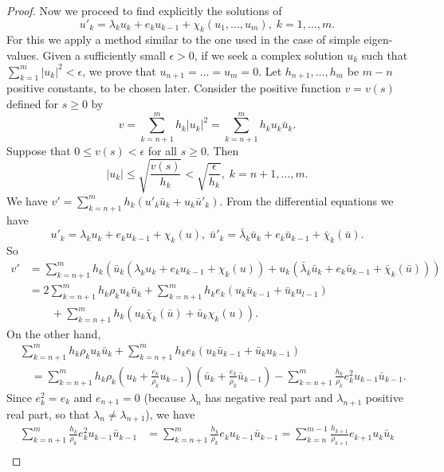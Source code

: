 \begin{proof}
Now we proceed to find explicitly the solutions of 
$$
u'_k  = \lambda_k u_k + e_k u_{k-1} + \chi_k (u_1, \ldots, u_m), \; k =1, \ldots, m.
$$
For this we apply a method similar to the one used in the case of
simple eigen-values. Given a sufficiently small $\epsilon > 0$, if we
seek a complex solution $u_k$ such that  $\sum\limits^m_{k=1} |u_k|^2
< \epsilon$, we prove that $u_{n+1} = \ldots = u_m = 0$.\pageoriginale
Let $h_{n+1}, \ldots, h_m$ be $m-n$ positive constants, to be chosen
later. Consider the positive function $v = v(s)$ defined for $s \geq
0$ by 
$$
v = \sum\limits^m_{k=n+1} h_k |u_k|^2 = \sum\limits^m_{k=n+1} h_k u_k
\bar{u}_k. 
$$
Suppose that $0 \leq v(s) < \epsilon$  for all $s \geq 0$. Then 
$$
|u_k| \leq \sqrt{\frac{v(s)}{h_k}} < \sqrt{\frac{\epsilon}{h_k}}, \; k
= n+1, \ldots, m. 
$$
We have $v' = \sum\limits^m_{k=n+1} h_k (u'_k \bar{u}_k+
u_k\bar{u}'_k) $. From the differential equations we have 
$$
u'_k= \lambda_k u_k + e_k u_{k-1} + \chi_k(u), \; \bar{u}'_k =
\bar{\lambda}_k \bar{u}_k + e_k \bar{u}_{k-1} + \bar{\chi}_k
(\bar{u}).  
$$
So
\begin{align*}
v' & = \sum\limits^m_{k=n+1} h_k (\bar{u}_k (\lambda_k u_k + e_k
u_{k-1} + \chi_k(u)) + u_k (\bar{\lambda}_k \bar{u}_k + e_k
\bar{u}_{k-1} + \bar{\chi}_k (\bar{u})))\\ 
& = 2 \sum\limits^m_{k=n+1} h_k \rho_k u_k \bar{u}_k +
\sum\limits^m_{k=n+1} h_k e_k (u_k \bar{u}_{k-1} + \bar{u}_k u_{l-1})\\
&\qquad + \sum\limits^m_{k=n+1} h_k (u_k \bar{\chi}_k (\bar{u}) + \bar{u}_k
\chi_k (u)). 
\end{align*}
On the other hand, 
\begin{align*}
& \sum\limits^m_{k=n+1} h_k \rho_k u_k \bar{u}_k +
  \sum\limits^m_{k=n+1} h_k e_k (u_k\bar{u}_{k-1} + \bar{u}_k
  u_{k-1})\\ 
& \quad  = \sum\limits^m_{k=n+1} h_k \rho_k(u_k + \frac{e_k}{\rho_k}
  u_{k-1}) (\bar{u}_k + \frac{e_k}{\rho_k} \bar{u}_{k-1}) -
  \sum\limits^m_{k=n+1} \frac{h_k}{\rho_k} e^{2}_k u_{k-1}
  \bar{u}_{k-1}. 
\end{align*}
Since $e^2_k = e_k$ and $e_{n+1} = 0$ (because $\lambda_n$ has
negative real part and $\lambda_{n+1}$ positive real part, so that
$\lambda_n \neq \lambda_{n+1}$), we have  
\begin{align*}
\sum\limits^m_{k=n+1} \frac{h_k}{\rho_k} e^2_k u_{k-1} \bar{u}_{k-1} &
= \sum\limits^m_{k=n+1} \frac{h_k}{\rho_k} e_k u_{k-1} \bar{u}_{k-1} =
\sum\limits^{m-1}_{k=n} \frac{h_{k+1}}{\rho_{k+1}} e_{k+1} u_k
\bar{u}_k\\ 

\end{align*}
\end{proof}
